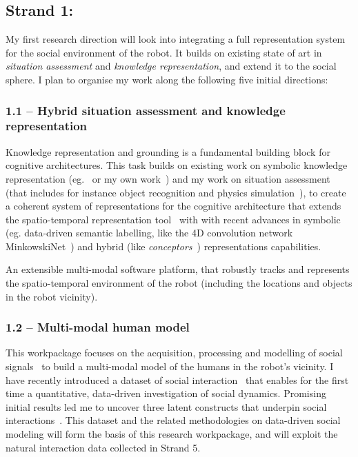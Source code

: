 \subsection{Strand 1: \textbf{\wpTwo}}

My first research direction will look into integrating a full representation
system for the social environment of the robot. It builds on existing state of
art in \emph{situation assessment} and \emph{knowledge representation}, and
extend it to the social sphere.  I plan to organise my work along the following
five initial directions:

\subsubsection{1.1 -- Hybrid situation assessment and knowledge representation}

Knowledge representation and grounding is a fundamental building block for
cognitive architectures\parencite{lemaignan2017artificial,beetz2010cram}. This task
builds on existing work on symbolic knowledge representation
(eg.~\parencite{tenorth2009knowrob} or my own work~\parencite{lemaignan2010oro}) and my
work on situation assessment~\parencite{lemaignan2018underworlds} (that includes for
instance object recognition and physics
simulation~\parencite{sallami2019simulation}), to create a coherent system of
representations for the cognitive architecture that extends the 
spatio-temporal representation tool~\parencite{lemaignan2018underworlds} with with
recent advances in symbolic (eg. data-driven semantic labelling, like the 4D
convolution network MinkowskiNet~\parencite{choy20194d}) and hybrid (like
\emph{conceptors}~\parencite{jaeger2014controlling}) representations capabilities.

\begin{outcome}{1.1}
An extensible multi-modal
    software platform, that robustly tracks and represents the spatio-temporal
    environment of the robot (including the locations and objects in the robot
    vicinity).
\end{outcome}

\subsubsection{1.2 -- Multi-modal human model}

This workpackage focuses on the acquisition, processing and modelling of social
signals~\parencite{gunes2017automatic} to build a multi-modal model of the humans
in the robot's vicinity. I have recently introduced a dataset of social
interaction~\parencite{lemaignan2018pinsoro} that enables for the first time a
quantitative, data-driven investigation of social dynamics. Promising initial
results led me to uncover three latent constructs that underpin social
interactions~\parencite{bartlett2019what}. This dataset and the related methodologies
on data-driven social modeling will form the basis of this research workpackage,
and will exploit the natural interaction data collected in Strand 5.

